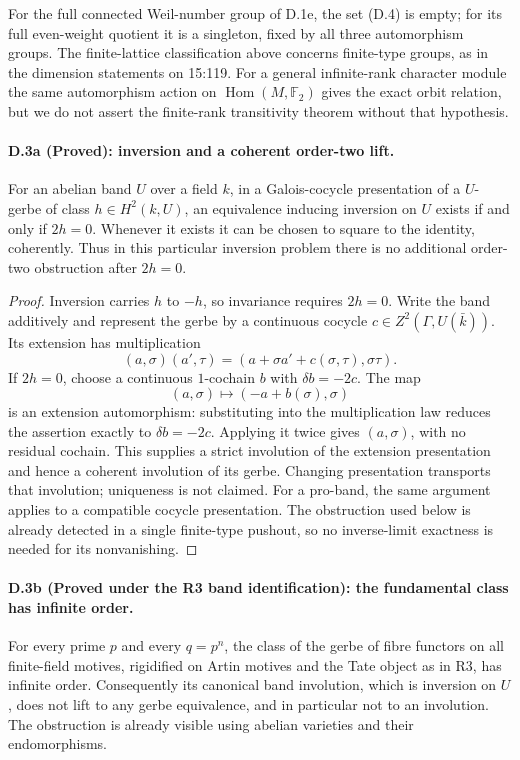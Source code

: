 For the full connected Weil-number group of D.1e, the set (D.4) is
empty; for its full even-weight quotient it is a singleton, fixed by
all three automorphism groups. The finite-lattice classification above
concerns finite-type groups, as in the dimension statements on 15:119.
For a general infinite-rank character module the same automorphism
action on $\operatorname{Hom}(M,\mathbb F_2)$ gives the exact orbit
relation, but we do not assert the finite-rank transitivity theorem
without that hypothesis.

\paragraph{D.3a (Proved): inversion and a coherent order-two lift.}
For an abelian band $U$ over a field $k$, in a Galois-cocycle presentation
of a $U$-gerbe of class $h\in H^2(k,U)$, an equivalence inducing inversion
on $U$ exists if and only if $2h=0$. Whenever it exists it can be chosen
to square to the identity, coherently. Thus in this particular inversion
problem there is no additional order-two obstruction after $2h=0$.

\begin{proof}
Inversion carries $h$ to $-h$, so invariance requires $2h=0$.
Write the band additively and represent the gerbe by a continuous cocycle
$c\in Z^2(\Gamma,U(\bar k))$. Its extension has multiplication
\[
 (a,\sigma)(a',\tau)
  =(a+\sigma a'+c(\sigma,\tau),\sigma\tau).
\]
If $2h=0$, choose a continuous $1$-cochain $b$ with $\delta b=-2c$.
The map
\[
 (a,\sigma)\longmapsto(-a+b(\sigma),\sigma)
 \tag{D.6}
\]
is an extension automorphism: substituting into the multiplication law
reduces the assertion exactly to $\delta b=-2c$. Applying it twice gives
$(a,\sigma)$, with no residual cochain. This supplies a strict involution
of the extension presentation and hence a coherent involution of its gerbe.
Changing presentation transports that involution; uniqueness is not claimed.
For a pro-band, the same argument applies to a compatible cocycle
presentation. The obstruction used below is already detected in a single
finite-type pushout, so no inverse-limit exactness is needed for its
nonvanishing.
\end{proof}

\paragraph{D.3b (Proved under the R3 band identification): the fundamental class has infinite order.}
For every prime $p$ and every $q=p^n$, the class of the gerbe of fibre functors
on all finite-field motives, rigidified on Artin motives and the Tate object
as in R3, has infinite order. Consequently its canonical band involution,
which is inversion on $U$, does not lift to any gerbe equivalence, and in
particular not to an involution. The obstruction is already visible using
abelian varieties and their endomorphisms.


